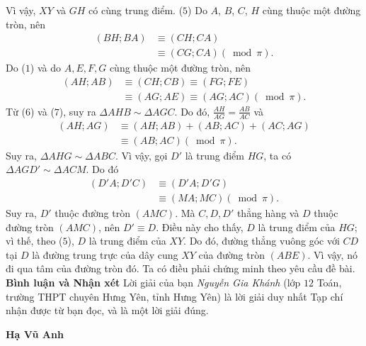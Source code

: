 \begin{multicols}{2}
	\vskip 0.05cm 
	Vì vậy, $XY$ và $GH$ có cùng trung điểm.                 \hfill ($5$)
	\vskip 0.05cm
	Do $A$, $B$, $C$, $H$ cùng thuộc một đường tròn, nên
	\begin{align*}
		\left( {BH;BA} \right) &\equiv \left( {CH;CA} \right) \\
		&\equiv \left( {CG;CA} \right)\left( {\bmod \pi } \right). \tag{$6$}
	\end{align*}
	Do ($1$) và do $A, E, F, G$ cùng thuộc một đường tròn, nên
	\begin{align*}
		\left( {AH;AB} \right) &\equiv \left( {CH;CB} \right) \equiv \left( {FG;FE} \right) \\
		&\equiv \left( {AG;AE} \right) \equiv \left( {AG;AC} \right)\left( {\bmod \pi } \right).
	\end{align*}
	Từ ($6$) và ($7$), suy ra $\Delta AHB \sim  \Delta AGC$.
	\vskip 0.05cm
	Do đó, $\frac{{AH}}{{AG}} = \frac{{AB}}{{AC}}$  và
	\begin{align*}
		\left(\! {AH;AG} \!\right) &\equiv \left(\! {AH;AB} \!\right) \!+\! \left(\! {AB;AC} \!\right) \!+\! \left(\! {AC;AG} \!\right)\\
		& \equiv \left( {AB;AC} \right)\left( {\bmod \pi } \right). \tag{$7$}
	\end{align*}
	Suy ra, $\Delta AHG \sim \Delta ABC$.
	\vskip 0.05cm
	Vì vậy, gọi $D'$  là trung điểm $HG$, ta có $\Delta AGD' \sim \Delta ACM$. Do đó
	\begin{align*}
		\left( {D'A;D'C} \right) &\equiv \left( {D'A;D'G} \right) \\
		&\equiv \left( {MA;MC} \right)\left( {\bmod \pi } \right).	
	\end{align*}
	Suy ra, $D'$ thuộc đường tròn $(AMC)$. Mà $C, D, D'$  thẳng hàng và $D$ thuộc đường tròn $(AMC)$, nên $D' \equiv D$.  Điều này cho thấy, $D$ là trung điểm của $HG$; vì thế, theo ($5$), $D$ là trung điểm của $XY$. Do đó, đường thẳng vuông góc với $CD$ tại $D$ là đường trung trực của dây cung $XY$ của đường tròn $(ABE)$. Vì vậy, nó đi qua tâm của đường tròn đó. Ta có điều phải chứng minh theo yêu cầu đề bài.
	\vskip 0.05cm
	\textbf{\color{thachthuctoanhoc}Bình luận và Nhận xét}
	\vskip 0.05cm
	Lời giải của bạn \textit{Nguyễn Gia Khánh} (lớp $12$ Toán, trường THPT chuyên Hưng Yên, tỉnh Hưng Yên) là lời giải duy nhất Tạp chí nhận được từ bạn đọc, và là một lời giải đúng.
	\begin{flushright}
		\textbf{\color{thachthuctoanhoc}Hạ Vũ Anh}
	\end{flushright}
	{}

\end{multicols}
